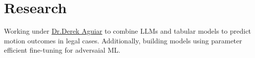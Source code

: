 \documentclass[]{resume-template}
\begin{document}
\begin{minipage}[t]{0.66\textwidth}

  \section{Research}\label{sec:research}
  \textbullet{} Working under \href{https://www.derekaguiar.com/}{Dr.Derek Aguiar} to combine LLMs and tabular models to predict motion outcomes in legal cases.
  Additionally, building models using parameter efficient fine-tuning for adversaial ML.



\end{minipage}
\end{document}
